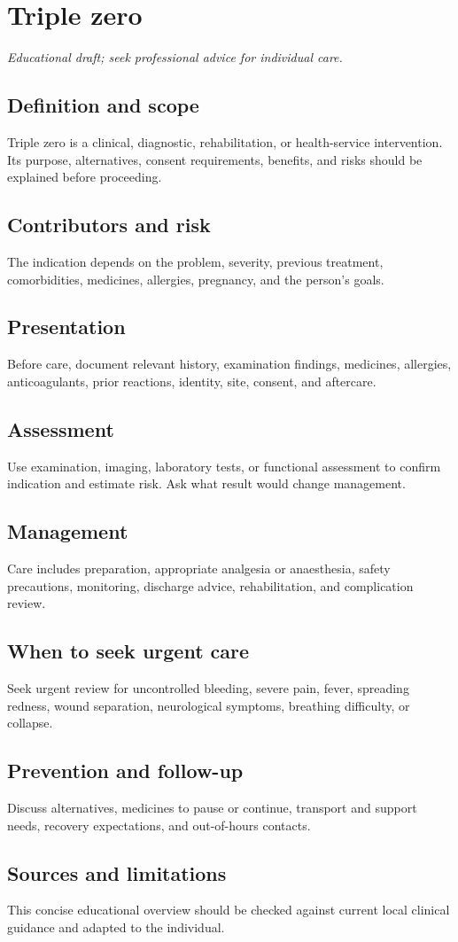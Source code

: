 \chapter{Triple zero}
\medskip
\noindent\textit{Educational draft; seek professional advice for individual care.}

\section*{Definition and scope}
Triple zero is a clinical, diagnostic, rehabilitation, or health-service intervention. Its purpose, alternatives, consent requirements, benefits, and risks should be explained before proceeding.

\section*{Contributors and risk}
The indication depends on the problem, severity, previous treatment, comorbidities, medicines, allergies, pregnancy, and the person’s goals.

\section*{Presentation}
Before care, document relevant history, examination findings, medicines, allergies, anticoagulants, prior reactions, identity, site, consent, and aftercare.

\section*{Assessment}
Use examination, imaging, laboratory tests, or functional assessment to confirm indication and estimate risk. Ask what result would change management.

\section*{Management}
Care includes preparation, appropriate analgesia or anaesthesia, safety precautions, monitoring, discharge advice, rehabilitation, and complication review.

\section*{When to seek urgent care}
Seek urgent review for uncontrolled bleeding, severe pain, fever, spreading redness, wound separation, neurological symptoms, breathing difficulty, or collapse.

\section*{Prevention and follow-up}
Discuss alternatives, medicines to pause or continue, transport and support needs, recovery expectations, and out-of-hours contacts.

\section*{Sources and limitations}
This concise educational overview should be checked against current local clinical guidance and adapted to the individual.

